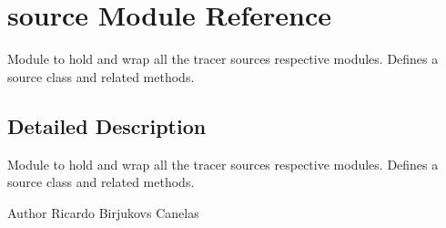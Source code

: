 \hypertarget{namespacesource}{}\section{source Module Reference}
\label{namespacesource}


Module to hold and wrap all the tracer sources respective modules. Defines a source class and related methods.  




\subsection{Detailed Description}
Module to hold and wrap all the tracer sources respective modules. Defines a source class and related methods. 

\begin{DoxyAuthor}{Author}
Ricardo Birjukovs Canelas 
\end{DoxyAuthor}
